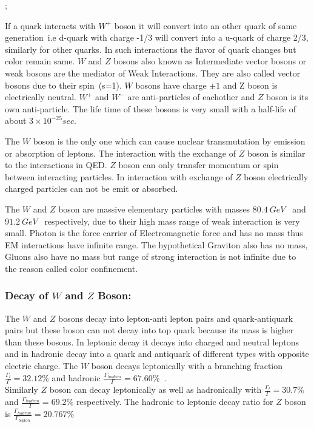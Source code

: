 \begin{center}
;
\end{center}
If a quark interacts with $W^{+}$ boson it will convert into an other quark of same generation~i.e d-quark with charge -1/3 will convert into a u-quark of charge 2/3, similarly for other quarks. In such interactions the flavor of quark changes but color remain same. $W$ and $Z$ bosons also known as Intermediate vector bosons or weak bosons are the mediator of Weak Interactions. They are also called vector bosons due to their spin~(s=1). $W$ bosons have charge $\pm1$ and Z boson is electrically neutral. $W^{+}$ and $W^{-}$ are anti-particles of eachother and $Z$ boson is its own anti-particle. The life time of these bosons is very small with a half-life of about $3\times10^{-25}sec$.  

The $W$ boson is the only one which can cause nuclear transmutation by emission or absorption of leptons. The interaction with the exchange of $Z$ boson is similar to the interactions in QED. $Z$ boson can only transfer momentum or spin between interacting particles. In interaction with exchange of $Z$ boson electrically charged particles can not be emit or absorbed.

The $W$ and $Z$ boson are massive elementary particles with masses $80.4~GeV$~\cite{ddd77f409a1d4f53a9ea8bbf3f2e016d} and $91.2~GeV$~\cite{ddd77f409a1d4f53a9ea8bbf3f2e016d} respectively, due to their high mass range of weak interaction is very small. Photon is the force carrier of Electromagnetic force and has no mass thus EM interactions have infinite range. The hypothetical Graviton also has no mass, Gluons also have no mass but range of strong interaction is not infinite due to the reason called color confinement. 
\subsubsection{Decay of $W$ and $Z$ Boson:}
The $W$ and $Z$ bosons decay into lepton-anti lepton pairs and quark-antiquark pairs but these boson can not decay into top quark because its mass is higher than these bosons. In leptonic decay it decays into charged and neutral leptons and in hadronic decay into a quark and antiquark of different types with opposite electric charge.
The $W$ boson decays leptonically with a branching fraction $\frac{\Gamma_{l}}{\Gamma}= 32.12\%$ and hadronic $\frac{\Gamma_{hadron}}{\Gamma}=67.60\%$~\cite{Wboson}.\\
Similarly $Z$ boson can decay leptonically as well as hadronically with $\frac{\Gamma_{l}}{\Gamma}= 30.7\%$ and $\frac{\Gamma_{hadron}}{\Gamma}=69.2\%$ respectively. The hadronic to leptonic decay ratio for $Z$ boson is $\frac{\Gamma_{hadron}}{\Gamma_{lepton}}=20.767\%$~\cite{Zboson}



